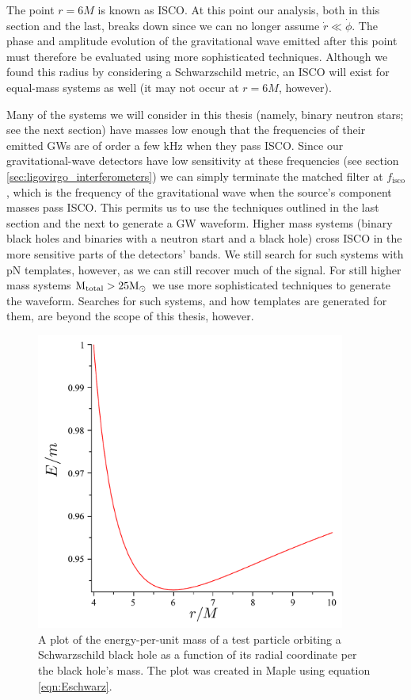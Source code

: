 The point $r=6M$ is known as \ac{ISCO}. At this point our analysis, both in this section and the last, breaks down since we can no longer assume $\dot{r} \ll \dot{\phi}$. The phase and amplitude evolution of the gravitational wave emitted after this point must therefore be evaluated using more sophisticated techniques. Although we found this radius by considering a Schwarzschild metric, an \ac{ISCO} will exist for equal-mass systems as well (it may not occur at $r=6M$, however).

Many of the systems we will consider in this thesis (namely, binary neutron stars; see the next section) have masses low enough that the frequencies of their emitted \acp{GW} are of order a few kHz when they pass \ac{ISCO}. Since our gravitational-wave detectors have low sensitivity at these frequencies (see section \ref{sec:ligovirgo_interferometers}) we can simply terminate the matched filter at $f_{\mathrm{isco}}$, which is the frequency of the gravitational wave when the source's component masses pass \ac{ISCO}. This permits us to use the techniques outlined in the last section and the next to generate a \ac{GW} waveform. Higher mass systems (binary black holes and binaries with a neutron start and a black hole) cross \ac{ISCO} in the more sensitive parts of the detectors' bands. We still search for such systems with \ac{pN} templates, however, as we can still recover much of the signal. For still higher mass systems $\mathrm{M_{total}} > 25\mathrm{M_\odot}$ we use more sophisticated techniques to generate the waveform. Searches for such systems, and how templates are generated for them, are beyond the scope of this thesis, however.

\begin{figure}[tbp]
\center
\includegraphics[width=4in]{figures/Eofrplot.pdf}
\caption{A plot of the energy-per-unit mass of a test particle orbiting a Schwarzschild black hole as a function of its radial coordinate per the black hole's mass. The plot was created in Maple using equation \ref{eqn:Eschwarz}.}
\label{fig:Eofr}
\end{figure}

